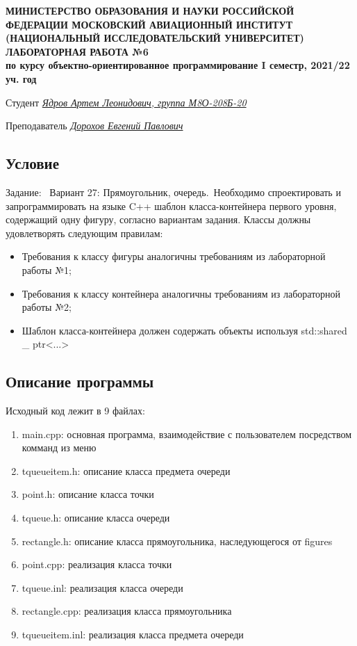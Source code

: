 \documentclass[12pt]{article}
\begin{document}
\begin{titlepage}
\begin{center}
\textbf{МИНИСТЕРСТВО ОБРАЗОВАНИЯ И НАУКИ РОССИЙСКОЙ ФЕДЕРАЦИИ
\medskip
МОСКОВСКИЙ АВИАЦИОННЫЙ ИНСТИТУТ
(НАЦИОНАЛЬНЫЙ ИССЛЕДОВАТЕЛЬСКИЙ УНИВЕРСИТЕТ)
\vfill\vfill
{\Huge ЛАБОРАТОРНАЯ РАБОТА №6} \\
по курсу объектно-ориентированное программирование
I семестр, 2021/22 уч. год}
\end{center}
\vfill

Студент \uline{\it {Ядров Артем Леонидович, группа М8О-208Б-20}\hfill}

Преподаватель \uline{\it {Дорохов Евгений Павлович}\hfill}

\vfill
\end{titlepage}

\subsection*{Условие}

Задание: \
Вариант 27: Прямоугольник, очередь.\
Необходимо спроектировать и запрограммировать на языке C++ шаблон класса-контейнера
первого уровня, содержащий одну фигуру, согласно вариантам задания.
Классы должны удовлетворять следующим правилам:
\begin{itemize}
	\item Требования к классу фигуры аналогичны требованиям из лабораторной работы №1;
	\item Требования к классу контейнера аналогичны требованиям из лабораторной работы №2;
	\item Шаблон класса-контейнера должен содержать объекты используя std::shared \_ ptr<...>
\end{itemize}


\subsection*{Описание программы}

Исходный код лежит в 9 файлах:
\begin{enumerate}
\item main.cpp: основная программа, взаимодействие с пользователем посредством комманд из меню

\item tqueueitem.h:    описание класса предмета очереди
\item point.h:     описание класса точки
\item tqueue.h:  описание класса очереди
\item rectangle.h: описание класса прямоугольника, наследующегося от figures
\item point.cpp:     реализация класса точки
\item tqueue.inl:  реализация класса очереди
\item rectangle.cpp: реализация класса прямоугольника
\item tqueueitem.inl:    реализация класса предмета очереди

\end{enumerate}
\end{document}
